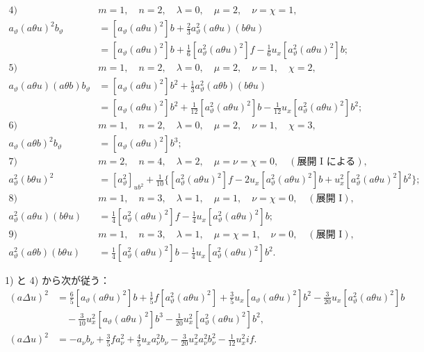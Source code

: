 \documentclass[11pt]{jlreq}
\begin{document}
\begin{align*}
\text{4)}\quad&m=1,\quad n=2,\quad \lambda=0,\quad \mu=2,\quad \nu=\chi=1,\\
a_\vartheta(a\theta u)^2b_\vartheta
&=[a_\vartheta(a\theta u)^2]b+\frac23a_\vartheta^2(a\theta u)(b\theta u)\\
&=[a_\vartheta(a\theta u)^2]b+\frac16[a_\vartheta^2(a\theta u)^2]f-\frac16u_x[a_\vartheta^2(a\theta u)^2]b;\\[.6em]
\text{5)}\quad&m=1,\quad n=2,\quad \lambda=0,\quad \mu=2,\quad \nu=1,\quad \chi=2,\\
a_\vartheta(a\theta u)(a\theta b)b_\vartheta
&=[a_\vartheta(a\theta u)^2]b^2+\frac13a_\vartheta^2(a\theta b)(b\theta u)\\
&=[a_\vartheta(a\theta u)^2]b^2+\frac1{12}[a_\vartheta^2(a\theta u)^2]b-\frac1{12}u_x[a_\vartheta^2(a\theta u)^2]b^2;\\[.6em]
\text{6)}\quad&m=1,\quad n=2,\quad \lambda=0,\quad \mu=2,\quad \nu=1,\quad \chi=3,\\
a_\vartheta(a\theta b)^2b_\vartheta&=[a_\vartheta(a\theta u)^2]b^3;\\[.6em]
\text{7)}\quad&m=2,\quad n=4,\quad \lambda=2,\quad \mu=\nu=\chi=0,\quad (\text{展開 I による}),\\
a_\vartheta^2(b\theta u)^2&=[a_\vartheta^2]_{ub^2}+\frac1{10}\{[a_\vartheta^2(a\theta u)^2]f-2u_x[a_\vartheta^2(a\theta u)^2]b+u_x^2[a_\vartheta^2(a\theta u)^2]b^2\};\\[.6em]
\text{8)}\quad&m=1,\quad n=3,\quad \lambda=1,\quad \mu=1,\quad \nu=\chi=0,\quad (\text{展開 I}),\\
a_\vartheta^2(a\theta u)(b\theta u)&=\frac14[a_\vartheta^2(a\theta u)^2]f-\frac14u_x[a_\vartheta^2(a\theta u)^2]b;\\[.6em]
\text{9)}\quad&m=1,\quad n=3,\quad \lambda=1,\quad \mu=\chi=1,\quad \nu=0,\quad (\text{展開 I}),\\
a_\vartheta^2(a\theta b)(b\theta u)&=\frac14[a_\vartheta^2(a\theta u)^2]b-\frac14u_x[a_\vartheta^2(a\theta u)^2]b^2.
\end{align*}

1) と 4) から次が従う：
\[
\begin{aligned}
(a\Delta u)^2
&=\frac65[a_\vartheta(a\theta u)^2]b+\frac15f[a_\vartheta^2(a\theta u)^2]+\frac35u_x[a_\vartheta(a\theta u)^2]b^2-\frac3{20}u_x[a_\vartheta^2(a\theta u)^2]b\\
&\quad-\frac3{10}u_x^2[a_\vartheta(a\theta u)^2]b^3-\frac1{20}u_x^2[a_\vartheta^2(a\theta u)^2]b^2,\\
(a\Delta u)^2
&=-a_\nu b_\nu+\frac35fa_\nu^2+\frac45u_xa_\nu^2b_\nu-\frac3{20}u_x^2a_\nu^2b_\nu^2-\frac1{12}u_x^2if.
\end{aligned}
\]
\end{document}
